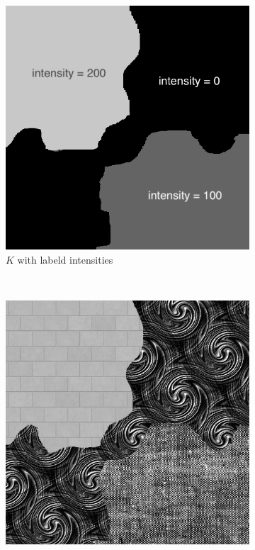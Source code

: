 \documentclass{article}
\begin{document}
\begin{enumerate}[label=(\alph*)]
        \begin{figure}[!htb]
            \centering
            \begin{subfigure}[b]{0.3\textwidth}
                \includegraphics[width=\textwidth]{img/KI.png}
                \caption{$K$ with labeld intensities}
            \end{subfigure}
            ~
            \begin{subfigure}[b]{0.3\textwidth}
                \includegraphics[width=\textwidth]{img/I2.png}

\end{subfigure}
\end{figure}
\end{enumerate}
\end{document}
